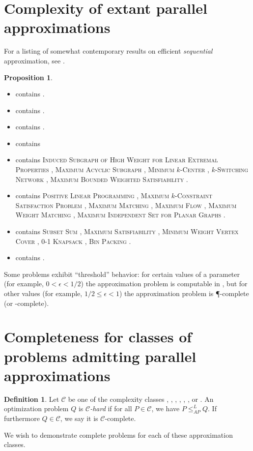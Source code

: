 \documentclass[]{article}
\theoremstyle{definition} \newtheorem{definition}{Definition}
\theoremstyle{definition} \newtheorem{openquestion}{Open question}
\newtheorem{proposition}{Proposition}
\newcommand{\APr}{\leq_{AP}^{L}}
\newcommand{\apxncoproblems}{%
  \textsc{Induced Subgraph of High Weight for Linear Extremal Properties} \cite{dsst97},
  \textsc{Maximum Acyclic Subgraph} \cite[Section~7.4]{dsst97},
  \textsc{Minimum $k$-Center} \cite[Section~7.4]{dsst97},
  \textsc{$k$-Switching Network} \cite[Section~7.4]{dsst97},
  \textsc{Maximum Bounded Weighted Satisfiability} \cite[Theorem~4]{sx95}}
\newcommand{\expapxncoproblems}{}
\newcommand{\fncasproblems}{%
  \textsc{Subset Sum} \cite[Theorem~4.1.4]{dsst97},
  \textsc{Maximum Satisfiability} \cite[Theorem~8]{trevisan98},
  \textsc{Minimum Weight Vertex Cover} \cite[Theorem~5.3.6]{dsst97},
  \textsc{0-1 Knapsack} \cite[Theorem~2]{mayr88},
  \textsc{Bin Packing} \cite[Theorem~3]{mayr88}}
\newcommand{\logapxncoproblems}{}
\newcommand{\ncasproblems}{%
  \textsc{Positive Linear Programming} \cite[Theorem~5.1.11]{dsst97},
  \textsc{Maximum $k$-Constraint Satisfaction Problem} \cite[Corollary~13]{trevisan98},
  \textsc{Maximum Matching} \cite[Theorem~5.2.1]{dsst97},
  \textsc{Maximum Flow} \cite[Theorem~5.2.2]{dsst97},
  \textsc{Maximum Weight Matching} \cite[Theorem~5.2.2]{dsst97},
  \textsc{Maximum Independent Set for Planar Graphs} \cite[Theorem 6.4.1]{dsst97}}
\newcommand{\ncoproblems}{}
\newcommand{\nncoproblems}{}
\newcommand{\polyapxncoproblems}{}
\begin{document}
\section{Complexity of extant parallel approximations}

For a listing of somewhat contemporary results on efficient \emph{sequential} approximation, see \cite{compendium}.

\begin{proposition}
  \mbox{}
  \begin{itemize}
  \item \NNCO{} contains \nncoproblems.
  \item \expApxNCO{} contains \expapxncoproblems.
  \item \polyApxNCO{} contains \polyapxncoproblems.
  \item \logApxNCO{} contains \logapxncoproblems
  \item \ApxNCO{} contains \apxncoproblems.
  \item \NCAS{} contains \ncasproblems.
  \item \FNCAS{} contains \fncasproblems.
  \item \NCO{} contains \ncoproblems.
  \end{itemize}
\end{proposition}

Some problems exhibit ``threshold'' behavior: for certain values of a parameter (for example, $0 < \epsilon < 1/2$) the approximation problem is computable in \NC, but for other values (for example, $1/2 \leq \epsilon < 1$) the approximation problem is \P-complete (or \NP-complete).

\section{Completeness for classes of problems admitting parallel approximations}
\label{sec:completeness}

\begin{definition}
  Let $\mathcal{C}$ be one of the complexity classes \NCO, \NCAS, \ApxNCO, \logApxNCO, \polyApxNCO, \expApxNCO, or \NNCO.
  An optimization problem $Q$ is \emph{$\mathcal{C}$-hard} if for all $P\in\mathcal{C}$, we have $P\APr Q$.
  If furthermore $Q\in\mathcal{C}$, we say it is $\mathcal{C}$-complete.
\end{definition}

We wish to demonstrate complete problems for each of these approximation classes.
\end{document}
